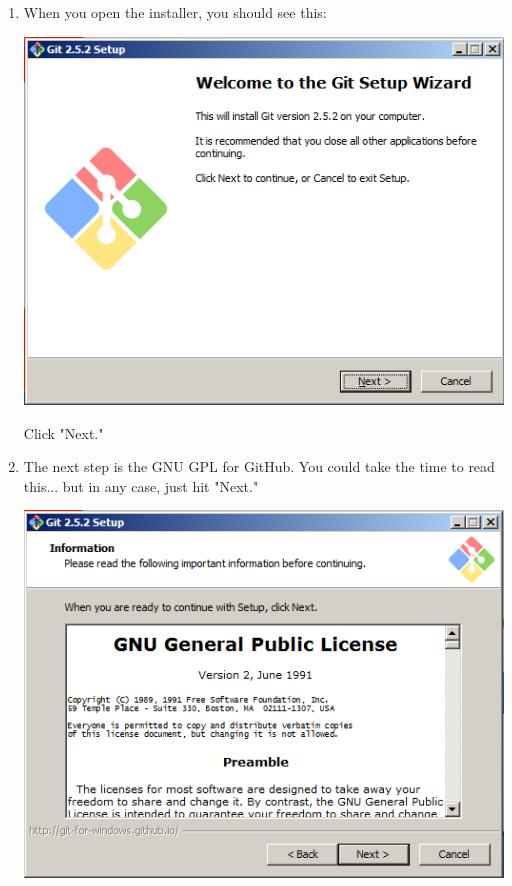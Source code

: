 \documentclass[11pt,fleqn]{article}
\theoremstyle{definition}
\begin{document}
\begin{enumerate}[Step 1.]
\item When you open the installer, you should see this:
\begin{center}
\includegraphics[scale=0.6]{gitwininstall1.png}
\end{center}
Click "Next."

\item The next step is the GNU GPL for GitHub. You could take the time to read this... but in any case, just hit "Next."
\begin{center}
\includegraphics[scale=0.6]{gitwininstall2.png}
\end{center}


\end{enumerate}
\end{document}
